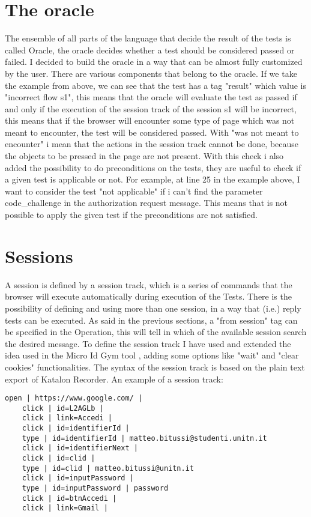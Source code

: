 \section{The oracle}
The ensemble of all parts of the language that decide the result of the tests is called Oracle,
the oracle decides whether a test should be considered passed or failed. I decided to build the oracle in a way that can be almost fully customized by the user. There are various components that belong to the oracle. If we take the example from above, we can see that the test has a tag "result" which value is "incorrect flow s1", this means that the oracle will evaluate the test as passed if and only if the execution of the session track of the session s1 will be incorrect, this means that if the browser will encounter some type of page which was not meant to encounter, the test will be considered passed. With "was not meant to encounter" i mean that the actions in the session track cannot be done, because the objects to be pressed in the page are not present.
With this check i also added the possibility to do preconditions on the tests, they are useful to check if a given test is applicable or not. For example, at line 25 in the example above, I want to consider the test "not applicable" if i can't find the parameter code\_challenge in the authorization request message. This means that is not possible to apply the given test if the preconditions are not satisfied.


\section{Sessions}
A session is defined by a session track, which is a series of commands that the browser will execute automatically during execution of the Tests. There is the possibility of defining and using more than one session, in a way that (i.e.) reply tests can be executed.
As said in the previous sections, a "from session" tag can be specified in the Operation, this will tell in which of the available session search the desired message. To define the session track I have used and extended the idea used in the Micro Id Gym tool \cite{claudio_grisenti}\cite{stefano_faccini}, adding some options like "wait" and "clear cookies" functionalities.
The syntax of the session track is based on the plain text export of Katalon Recorder\cite{katalon_recorder_syntax}.
An example of a session track:

\begin{lstlisting}[]
    open | https://www.google.com/ |
    click | id=L2AGLb |
    click | link=Accedi |
    click | id=identifierId |
    type | id=identifierId | matteo.bitussi@studenti.unitn.it
    click | id=identifierNext |
    click | id=clid |
    type | id=clid | matteo.bitussi@unitn.it
    click | id=inputPassword |
    type | id=inputPassword | password
    click | id=btnAccedi |
    click | link=Gmail |
\end{lstlisting}

